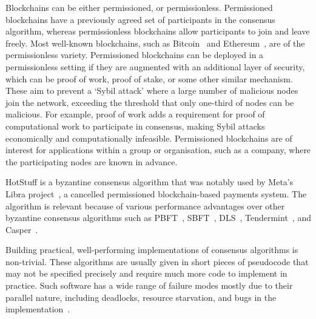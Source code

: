 Blockchains can be either permissioned, or permissionless. Permissioned blockchains have a previously agreed set of participants in the consensus algorithm, whereas permissionless blockchains allow participants to join and leave freely. Most well-known blockchains, such as Bitcoin~\cite{nakamotoBitcoinPeertoPeerElectronic2008} and Ethereum~\cite{ethereumWhite, ethereumYellow}, are of the permissionless variety. Permissioned blockchains can be deployed in a permissionless setting if they are augmented with an additional layer of security, which can be proof of work, proof of stake, or some other similar mechanism. These aim to prevent a `Sybil attack' where a large number of malicious nodes join the network, exceeding the threshold that only one-third of nodes can be malicious. For example, proof of work adds a requirement for proof of computational work to participate in consensus, making Sybil attacks economically and computationally infeasible. Permissioned blockchains are of interest for applications within a group or organisation, such as a company, where the participating nodes are known in advance.

HotStuff is a byzantine consensus algorithm that was notably used by Meta's Libra project~\cite{baudetStateMachineReplication2019}, a cancelled permissioned blockchain-based payments system. The algorithm is relevant because of various performance advantages over other byzantine consensus algorithms such as PBFT~\cite{castroPracticalByzantineFault1999}, SBFT~\cite{golanguetaSBFTScalableDecentralized2019}, DLS~\cite{dworkConsensusPresencePartial1988}, Tendermint~\cite{kwonTendermintConsensusMining2014}, and Casper~\cite{buterinCasperFriendlyFinality2019}.

Building practical, well-performing implementations of consensus algorithms is non-trivial. These algorithms are usually given in short pieces of pseudocode that may not be specified precisely and require much more code to implement in practice. Such software has a wide range of failure modes mostly due to their parallel nature, including deadlocks, resource starvation, and bugs in the implementation~\cite{chandraPaxosMadeLive2007}.

